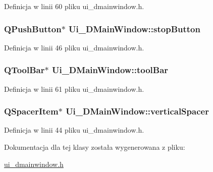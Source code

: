 Definicja w linii 60 pliku ui\-\_\-dmainwindow.\-h.

\hypertarget{class_ui___d_main_window_a1fe7797fff349a0f0d47d90c8438f386}{
\subsubsection[{stop\-Button}]{\setlength{\rightskip}{0pt plus 5cm}Q\-Push\-Button$\ast$ Ui\-\_\-\-D\-Main\-Window\-::stop\-Button}}\label{class_ui___d_main_window_a1fe7797fff349a0f0d47d90c8438f386}


Definicja w linii 46 pliku ui\-\_\-dmainwindow.\-h.

\hypertarget{class_ui___d_main_window_abba1dae1dd835c7a7dd39da623cd4580}{
\subsubsection[{tool\-Bar}]{\setlength{\rightskip}{0pt plus 5cm}Q\-Tool\-Bar$\ast$ Ui\-\_\-\-D\-Main\-Window\-::tool\-Bar}}\label{class_ui___d_main_window_abba1dae1dd835c7a7dd39da623cd4580}


Definicja w linii 61 pliku ui\-\_\-dmainwindow.\-h.

\hypertarget{class_ui___d_main_window_a476471e78bf431c7487fa9e0afadb76d}{
\subsubsection[{vertical\-Spacer}]{\setlength{\rightskip}{0pt plus 5cm}Q\-Spacer\-Item$\ast$ Ui\-\_\-\-D\-Main\-Window\-::vertical\-Spacer}}\label{class_ui___d_main_window_a476471e78bf431c7487fa9e0afadb76d}


Definicja w linii 44 pliku ui\-\_\-dmainwindow.\-h.



Dokumentacja dla tej klasy została wygenerowana z pliku\-:\begin{DoxyCompactItemize}
\item 
\hyperlink{ui__dmainwindow_8h}{ui\-\_\-dmainwindow.\-h}\end{DoxyCompactItemize}
